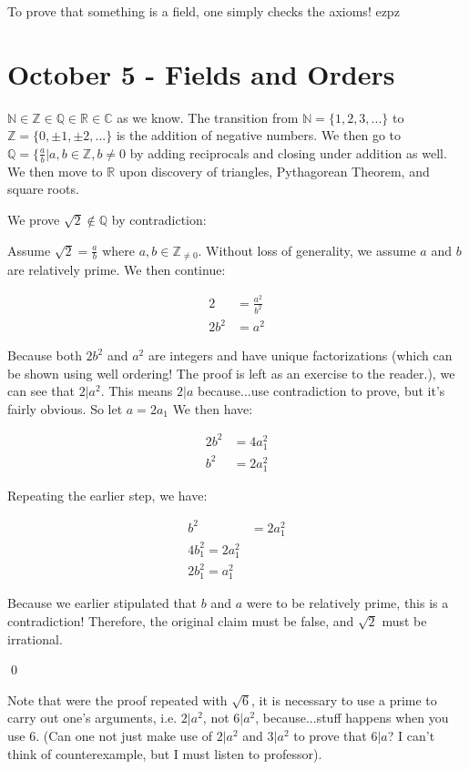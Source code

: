 \documentclass{report}
\begin{document}
To prove that something is a field, one simply checks the axioms! ezpz

\chapter{October 5 - Fields and Orders}

$\mathbb{N} \in \mathbb{Z} \in \mathbb{Q} \in \mathbb{R} \in \mathbb{C}$ as we know. The transition from $\mathbb{N} = \{ 1,2,3,...\}$ to $\mathbb{Z} = \{0, \pm 1, \pm 2,...\}$ is the addition of negative numbers. We then go to $\mathbb{Q} = \{\frac{a}{b} | a,b \in \mathbb{Z}, b \neq 0$ by adding reciprocals and closing under addition as well. We then move to $\mathbb{R}$ upon discovery of triangles, Pythagorean Theorem, and square roots. 

We prove $\sqrt{2} \notin \mathbb{Q}$ by contradiction:

Assume $\sqrt{2} = \frac{a}{b}$ where $a,b \in \mathbb{Z}_{\neq 0}$. Without loss of generality, we assume $a$ and $b$ are relatively prime. We then continue:

\begin{align*}
2 &= \frac{a^2}{b^2}\\
2b^2 &= a^2
\end{align*}

Because both $2b^2$ and $a^2$ are integers and have unique factorizations (which can be shown using well ordering! The proof is left as an exercise to the reader.), we can see that $2 | a^2$. This means $2|a$ because...use contradiction to prove, but it's fairly obvious. So let $a = 2a_1$ We then have:

\begin{align*}
2b^2 &= 4a_1^2 \\
b^2 &= 2a_1^2
\end{align*}

Repeating the earlier step, we have:

\begin{align*}
b^2 &= 2a_1^2\\
4b_1^2 = 2a_1^2\\
2b_1^2 = a_1^2
\end{align*}

Because we earlier stipulated that $b$ and $a$ were to be relatively prime, this is a contradiction! Therefore, the original claim must be false, and $\sqrt{2}$ must be irrational.

\qed

Note that were the proof repeated with $\sqrt{6}$, it is necessary to use a prime to carry out one's arguments, i.e. $2|a^2$, not $6|a^2$, because...stuff happens when you use $6$. (Can one not just make use of $2|a^2$ and $3|a^2$ to prove that $6|a$? I can't think of counterexample, but I must listen to professor).
\end{document}
